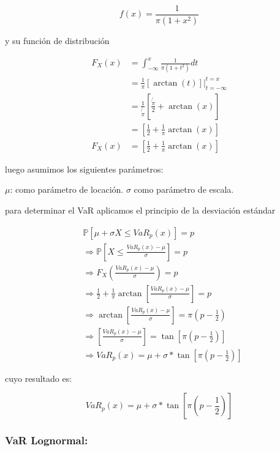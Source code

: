 \documentclass[]{article}
\begin{document}
\[f(x)= \frac{1}{\pi(1+x^2)}\]

y su función de distribución

\[\begin{array}{rl}
F_{X}(x) &=\int_{-\infty}^{x} \frac{1}{\pi(1+t^2)}dt\\
&\displaystyle =\frac{1}{\pi} \left[ \arctan(t) \right] \big |_{t=-\infty}^{t=x}\\
&\displaystyle =\frac{1}{\not{\pi}} \left[ \frac{\not{\pi}}{2}+ \arctan(x)\right]\\
&\displaystyle =\left[ \frac{1}{2} + \frac{1}{\pi}\arctan(x)\right]\\
F_{X}(x) &=\left[ \frac{1}{2} + \frac{1}{\pi}\arctan(x)\right]
\end{array}\]

luego asumimos los siguientes parámetros:

\(\mu\): como parámetro de locación. \(\sigma\) como parámetro de
escala.

para determinar el VaR aplicamos el principio de la desviación estándar

\[\begin{array}{rl}  
&\displaystyle  \mathbb{P}[\mu + \sigma X \leq VaR_{p}(x)] = p\\
&\displaystyle  \Rightarrow \mathbb{P}[X \leq \frac{VaR_{p}(x)- \mu}{\sigma}] = p\\
&\displaystyle  \Rightarrow F_{X}(\frac{VaR_{p}(x)- \mu}{\sigma}) = p\\
&\displaystyle  \Rightarrow \frac{1}{2} + \frac{1}{\pi}\arctan\left[\frac{VaR_{p}(x) - \mu}{\sigma}\right] = p\\
&\displaystyle  \Rightarrow \arctan\left[\frac{VaR_{p}(x) - \mu}{\sigma}\right] = \pi(p-\frac{1}{2})\\
&\displaystyle  \Rightarrow \left[\frac{VaR_{p}(x) - \mu}{\sigma}\right] = \tan\left[\pi(p-\frac{1}{2})\right]\\
&\displaystyle  \Rightarrow VaR_p(x)=\mu+\sigma*\tan\left[\pi\left(p-\frac{1}{2}\right)\right]
\end{array}\]

cuyo resultado es:

\[VaR_p(x)=\mu+\sigma*\tan\left[\pi\left(p-\frac{1}{2}\right)\right]\]

\hypertarget{var-lognormal}{%
\subsubsection{\texorpdfstring{\textbf{VaR
Lognormal:}}{VaR Lognormal:}}\label{var-lognormal}}
\end{document}
